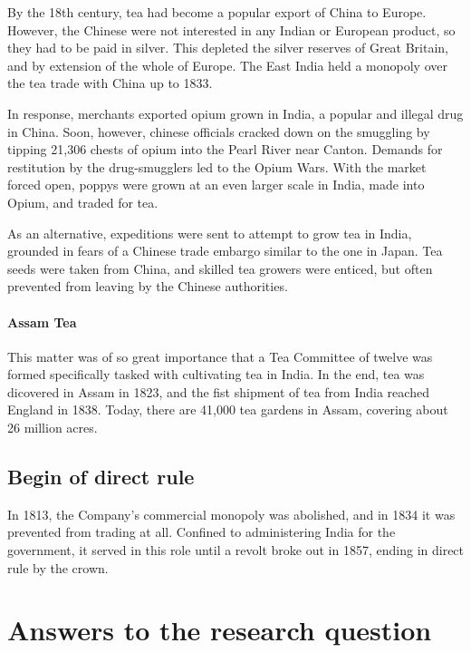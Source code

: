 \documentclass[11pt, a4paper, headings=standardclasses]{scrartcl}
\begin{document}
By the 18th century, tea had become a popular export of China to Europe. However, the Chinese were not interested in any Indian or European product, so they had to be paid in silver. This depleted the silver reserves of Great Britain, and by extension of the whole of Europe.\autocite[214]{Tea} The East India held a monopoly over the tea trade with China up to 1833\autocite{parliament}.

In response, merchants exported opium grown in India, a popular and illegal drug in China.\autocite[215]{Tea} Soon, however, chinese officials cracked down on the smuggling by tipping 21,306 chests of opium into the Pearl River near Canton.\autocite[203]{Tea} Demands for restitution by the drug-smugglers led to the Opium Wars.\autocite{Opium} With the market forced open, poppys were grown at an even larger scale in India, made into Opium, and traded for tea.\autocite[218-219]{Tea}\label{tea}

As an alternative, expeditions were sent to attempt to grow tea in India, grounded in fears of a Chinese trade embargo similar to the one in Japan.\autocite[211]{Tea} Tea seeds were taken from China, and skilled tea growers were enticed, but often prevented from leaving by the Chinese authorities.\autocite[210]{Tea}

\paragraph{Assam Tea}

This matter was of so great importance that a Tea Committee of twelve was formed specifically tasked with cultivating tea in India.\autocite[210]{Tea} In the end, tea was dicovered in Assam in 1823,\autocite[209]{Tea} and the fist shipment of tea from India reached England in 1838. Today, there are 41,000 tea gardens in Assam, covering about 26 million acres.\autocite{roy}\label{assam}

\subsection{Begin of direct rule}

In 1813, the Company's commercial monopoly was abolished, and in 1834 it was prevented from trading at all. Confined to administering India for the government, it served in this role until a revolt broke out in 1857, ending in direct rule by the crown.\autocite{parliament}

\section{Answers to the research question}
\end{document}
